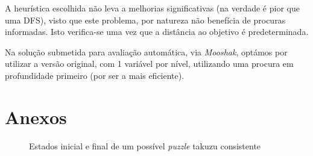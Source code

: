 \documentclass[12pt,a4paper]{article}
\begin{document}
A heurística escolhida não leva a melhorias significativas (na verdade é pior que uma DFS), visto que este problema, por natureza não benefícia de procuras informadas.
Isto verifica-se uma vez que a distância ao objetivo é predeterminada.

Na solução submetida para avaliação automática, via \textit{Mooshak}, optámos por utilizar a versão original, com 1 variável por nível, utilizando uma procura em profundidade primeiro (por ser a mais eficiente).

\section*{Anexos}

\begin{figure}[H]
  \centering
  
  \hspace*{1cm}
  
  \caption{Estados inicial e final de um possível \textit{puzzle} takuzu consistente}
  \label{fig:takuzu-initial-state}
\end{figure}
\end{document}
